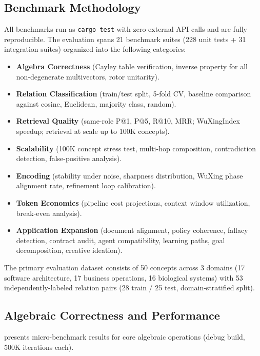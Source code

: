 \documentclass[11pt,a4paper]{article}
\begin{document}
\subsection{Benchmark Methodology}

All benchmarks run as \texttt{cargo test} with zero external API calls and are
fully reproducible. The evaluation spans 21 benchmark suites (228 unit tests
+ 31 integration suites) organized into the following categories:

\begin{itemize}[nosep]
\item \textbf{Algebra Correctness} (Cayley table verification, inverse
  property for all non-degenerate multivectors, rotor unitarity).
\item \textbf{Relation Classification} (train/test split, 5-fold CV,
  baseline comparison against cosine, Euclidean, majority class, random).
\item \textbf{Retrieval Quality} (same-role P@1, P@5, R@10, MRR; WuXingIndex
  speedup; retrieval at scale up to 100K concepts).
\item \textbf{Scalability} (100K concept stress test, multi-hop composition,
  contradiction detection, false-positive analysis).
\item \textbf{Encoding} (stability under noise, sharpness distribution,
  WuXing phase alignment rate, refinement loop calibration).
\item \textbf{Token Economics} (pipeline cost projections, context window
  utilization, break-even analysis).
\item \textbf{Application Expansion} (document alignment, policy coherence,
  fallacy detection, contract audit, agent compatibility, learning paths,
  goal decomposition, creative ideation).
\end{itemize}

The primary evaluation dataset consists of 50 concepts across 3 domains (17
software architecture, 17 business operations, 16 biological systems) with 53
independently-labeled relation pairs (28 train / 25 test, domain-stratified
split).

\subsection{Algebraic Correctness and Performance}

 presents micro-benchmark results for core algebraic
operations (debug build, 500K iterations each).
\end{document}
